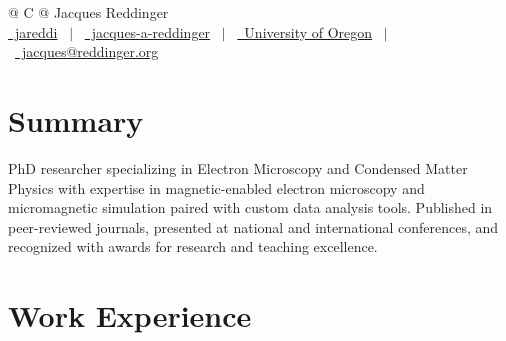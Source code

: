 \documentclass[a4paper,12pt]{article}
\begin{document}
\pagestyle{empty} 



\begin{tabularx}{\linewidth}{@{} C @{}}
\Huge{Jacques Reddinger} \\[7.5pt]
\href{https://github.com/jareddi}{\raisebox{-0.05\height}\faGithub\ jareddi} \ $|$ \ 
\href{https://linkedin.com/in/jacques-a-reddinger}{\raisebox{-0.05\height}\faLinkedin\ jacques-a-reddinger} \ $|$ \ 
\href{https://cas.uoregon.edu/directory/natural-sciences/all/jacquesr}{\raisebox{-0.05\height}\faGlobe \ University of Oregon} \ $|$ \ 
\href{mailto:jacques@reddinger.org}{\raisebox{-0.05\height}\faEnvelope \ jacques@reddinger.org} \\
\end{tabularx}


\section{Summary}
PhD researcher specializing in Electron Microscopy and Condensed Matter Physics with expertise in magnetic-enabled electron microscopy and micromagnetic simulation paired with custom data analysis tools. Published in peer-reviewed journals, presented at national and international conferences, and recognized with awards for research and teaching excellence.

\section{Work Experience}
\end{document}
